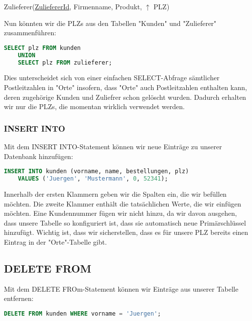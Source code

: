 \documentclass{article}
\begin{document}
	\begin{center}
		Zulieferer(\underline{ZuliefererId}, Firmenname, Produkt, $\uparrow$ PLZ) \\
	\end{center}

	Nun könnten wir die PLZs aus den Tabellen "Kunden" und "Zulieferer" zusammenführen:

	\begin{lstlisting}[language=SQL, caption=Wir sammeln sämtliche momentan benutzten PLZs in unserer Datenbank ein]
	SELECT plz FROM kunden
	UNION
	SELECT plz FROM zulieferer;
	\end{lstlisting}

	Dies unterscheidet sich von einer einfachen SELECT-Abfrage sämtlicher Postleitzahlen in "Orte" insofern, dass "Orte" auch Postleitzahlen enthalten kann, deren zugehörige Kunden und Zuliefrer schon gelöscht wurden. Dadurch erhalten wir nur die PLZs, die momentan wirklich verwendet werden.

	\subsubsection{INSERT INTO}
	Mit dem INSERT INTO-Statement können wir neue Einträge zu unserer Datenbank hinzufügen:

	\begin{lstlisting}[language=SQL, caption=Wir fügen neue Einträge zu der Kunden-Tabelle hinzu]
	INSERT INTO kunden (vorname, name, bestellungen, plz) 
	VALUES ('Juergen', 'Mustermann', 0, 52341);
	\end{lstlisting}

	Innerhalb der ersten Klammern geben wir die Spalten ein, die wir befüllen möchten. Die zweite Klammer enthält die tatsächlichen Werte, die wir einfügen möchten. Eine Kundennummer fügen wir nicht hinzu, da wir davon ausgehen, dass unsere Tabelle so konfiguriert ist, dass sie automatisch neue Primärschlüssel hinzufügt. Wichtig ist, dass wir sicherstellen, dass es für unsere PLZ bereits einen Eintrag in der "Orte"-Tabelle gibt.

	\subsection{DELETE FROM}
	Mit dem DELETE FROm-Statement können wir Einträge aus unserer Tabelle entfernen:

	\begin{lstlisting}[language=SQL, caption=Wir entfernen alle Jürgens aus unserer Kundentabelle]
	DELETE FROM kunden WHERE vorname = 'Juergen';
	\end{lstlisting}
\end{document}
